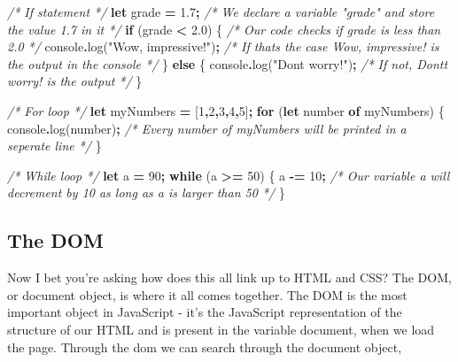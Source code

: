 \documentclass[
]{book}
\newenvironment{Shaded}{\begin{snugshade}}{\end{snugshade}}
\newcommand{\BuiltInTok}[1]{#1}
\newcommand{\CommentTok}[1]{\textcolor[rgb]{0.56,0.35,0.01}{\textit{#1}}}
\newcommand{\ControlFlowTok}[1]{\textcolor[rgb]{0.13,0.29,0.53}{\textbf{#1}}}
\newcommand{\DecValTok}[1]{\textcolor[rgb]{0.00,0.00,0.81}{#1}}
\newcommand{\FloatTok}[1]{\textcolor[rgb]{0.00,0.00,0.81}{#1}}
\newcommand{\FunctionTok}[1]{\textcolor[rgb]{0.00,0.00,0.00}{#1}}
\newcommand{\KeywordTok}[1]{\textcolor[rgb]{0.13,0.29,0.53}{\textbf{#1}}}
\newcommand{\NormalTok}[1]{#1}
\newcommand{\OperatorTok}[1]{\textcolor[rgb]{0.81,0.36,0.00}{\textbf{#1}}}
\newcommand{\StringTok}[1]{\textcolor[rgb]{0.31,0.60,0.02}{#1}}
\begin{document}
\begin{Shaded}
\begin{Highlighting}[]
\CommentTok{/* If statement */}
\KeywordTok{let}\NormalTok{ grade }\OperatorTok{=} \FloatTok{1.7}\OperatorTok{;} \CommentTok{/* We declare a variable "grade" and store the value 1.7 in it */}
\ControlFlowTok{if}\NormalTok{ (grade }\OperatorTok{\textless{}} \FloatTok{2.0}\NormalTok{) \{ }\CommentTok{/* Our code checks if grade is less than 2.0 */}
  \BuiltInTok{console}\OperatorTok{.}\FunctionTok{log}\NormalTok{(}\StringTok{"Wow, impressive!"}\NormalTok{)}\OperatorTok{;} \CommentTok{/* If that\textquotesingle{}s the case \textquotesingle{}Wow, impressive!\textquotesingle{} is the output in the console */}
\NormalTok{\}}
\ControlFlowTok{else}\NormalTok{ \{}
  \BuiltInTok{console}\OperatorTok{.}\FunctionTok{log}\NormalTok{(}\StringTok{"Don\textquotesingle{}t worry!"}\NormalTok{)}\OperatorTok{;} \CommentTok{/* If not, \textquotesingle{}Dont\textquotesingle{}t worry!\textquotesingle{} is the output */}
\NormalTok{\}}

\CommentTok{/* For loop */}
\KeywordTok{let}\NormalTok{ myNumbers }\OperatorTok{=}\NormalTok{ [}\DecValTok{1}\OperatorTok{,}\DecValTok{2}\OperatorTok{,}\DecValTok{3}\OperatorTok{,}\DecValTok{4}\OperatorTok{,}\DecValTok{5}\NormalTok{]}\OperatorTok{;}
\ControlFlowTok{for}\NormalTok{ (}\KeywordTok{let}\NormalTok{ number }\KeywordTok{of}\NormalTok{ myNumbers) \{}
  \BuiltInTok{console}\OperatorTok{.}\FunctionTok{log}\NormalTok{(number)}\OperatorTok{;} \CommentTok{/* Every number of myNumbers will be printed in a seperate line */}
\NormalTok{\}}

\CommentTok{/* While loop */}
\KeywordTok{let}\NormalTok{ a }\OperatorTok{=} \DecValTok{90}\OperatorTok{;}
\ControlFlowTok{while}\NormalTok{ (a }\OperatorTok{\textgreater{}=} \DecValTok{50}\NormalTok{) \{}
\NormalTok{  a }\OperatorTok{{-}=} \DecValTok{10}\OperatorTok{;}  \CommentTok{/* Our variable a will decrement by 10 as long as a is larger than 50 */}
\NormalTok{\}}
\end{Highlighting}
\end{Shaded}

\hypertarget{the-dom}{%
\subsection*{The DOM}\label{the-dom}}

Now I bet you're asking how does this all link up to HTML and CSS? The DOM, or document object, is where it all comes together. The DOM is the most important object in JavaScript - it's the JavaScript representation of the structure of our HTML and is present in the variable document, when we load the page. Through the dom we can search through the document object,
\end{document}
